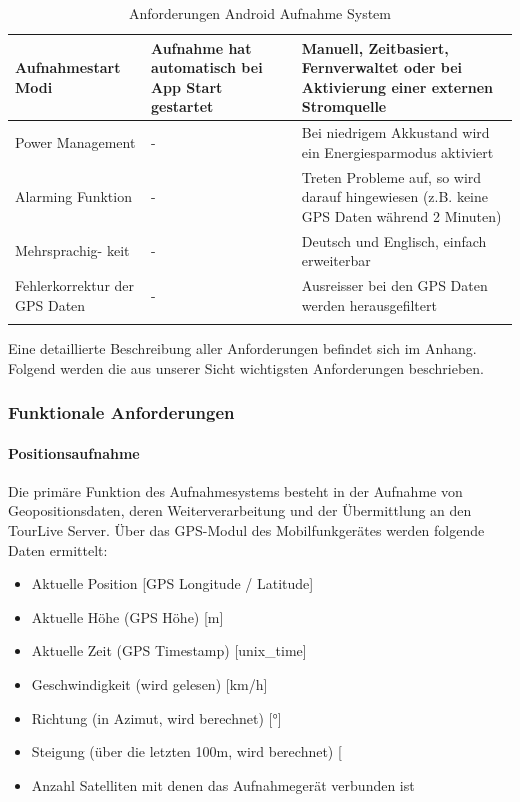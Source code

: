 {\begin{longtable}{  p{3.5cm} | p{4.3cm} | p{4.3cm} }
    \hline 
    Aufnahmestart Modi & Aufnahme hat automatisch bei App Start gestartet & Manuell, Zeitbasiert, Fernverwaltet oder bei Aktivierung einer externen Stromquelle\\
    \hline 
   	Power Management & - & Bei niedrigem Akkustand wird ein Energiesparmodus aktiviert\\
    \hline 
    Alarming Funktion & - & Treten Probleme auf, so wird darauf hingewiesen (z.B. keine GPS Daten w\"{a}hrend 2 Minuten)\\
    \hline 
    Mehrsprachig- keit & - & Deutsch und Englisch, einfach erweiterbar\\
    \hline 
    Fehlerkorrektur der GPS Daten & - & Ausreisser bei den GPS Daten werden herausgefiltert\\
    
    
\caption{Anforderungen Android Aufnahme System}
\end{longtable}}

Eine detaillierte Beschreibung aller Anforderungen befindet sich im Anhang. Folgend werden die aus unserer Sicht wichtigsten Anforderungen beschrieben.

\subsubsection{Funktionale Anforderungen}
\paragraph{Positionsaufnahme}
Die primäre Funktion des Aufnahmesystems besteht in der Aufnahme von Geopositionsdaten, deren Weiterverarbeitung und der Übermittlung an den TourLive Server. Über das GPS-Modul des Mobilfunkgerätes werden folgende Daten ermittelt:
\begin{itemize}
\item Aktuelle Position [GPS Longitude / Latitude]
\item Aktuelle H\"{o}he (GPS H\"{o}he) [m]
\item Aktuelle Zeit (GPS Timestamp) [unix\_time]
\item Geschwindigkeit (wird gelesen) [km/h]
\item Richtung (in Azimut, wird berechnet) [°]
\item Steigung (\"{u}ber die letzten 100m, wird berechnet) [%
\item Anzahl Satelliten mit denen das Aufnahmeger\"{a}t verbunden ist
\end{itemize}

